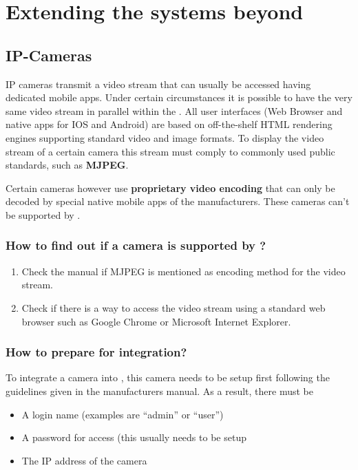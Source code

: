 \chapter{Extending the systems beyond \zwave}
\label{extensions}

\section{IP-Cameras}

IP cameras transmit a video stream that can usually be accessed having dedicated mobile 
apps. Under certain circumstances it is possible to have the very same video stream in 
parallel within the \zwshui.
All \zway user interfaces (Web Browser and native apps for IOS and Android) are based on 
off-the-shelf HTML rendering engines supporting standard video and image formats. To 
display the video stream of a certain camera this stream must comply to commonly used 
public standards, such as \textbf{MJPEG}.

Certain cameras however use \textbf{proprietary video encoding} that can only be decoded 
by special native mobile apps of the manufacturers. These cameras can’t be supported by \zway.

\subsection{How to find out if a camera is supported by \zway?}

\begin{enumerate}
\item Check the manual if MJPEG is mentioned as encoding method for the video stream.
\item Check if there is a way to access the video stream using a standard web browser 
such as Google Chrome or Microsoft Internet Explorer.
\end{enumerate}

\subsection{How to prepare for integration?}

To integrate a camera into \zway, this camera needs to be setup first following the 
guidelines given in the manufacturers manual. As a result, there must be

\begin{itemize}
\item A login name (examples are “admin” or “user”)
\item A password for access (this usually needs to be setup
\item The IP address of the camera
\end{itemize}

